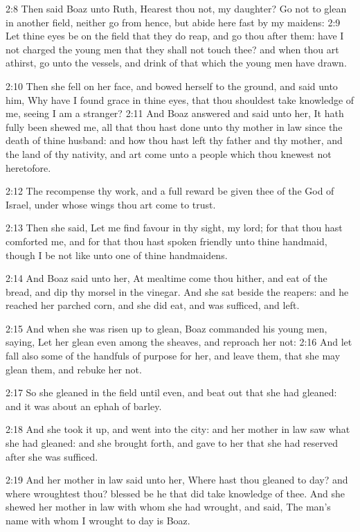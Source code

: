 2:8 Then said Boaz unto Ruth, Hearest thou not, my daughter? Go not to
glean in another field, neither go from hence, but abide here fast by
my maidens: 2:9 Let thine eyes be on the field that they do reap, and
go thou after them: have I not charged the young men that they shall
not touch thee? and when thou art athirst, go unto the vessels, and
drink of that which the young men have drawn.

2:10 Then she fell on her face, and bowed herself to the ground, and
said unto him, Why have I found grace in thine eyes, that thou
shouldest take knowledge of me, seeing I am a stranger?  2:11 And Boaz
answered and said unto her, It hath fully been shewed me, all that
thou hast done unto thy mother in law since the death of thine
husband: and how thou hast left thy father and thy mother, and the
land of thy nativity, and art come unto a people which thou knewest
not heretofore.

2:12 The \LORD recompense thy work, and a full reward be given thee of
the \LORD God of Israel, under whose wings thou art come to trust.

2:13 Then she said, Let me find favour in thy sight, my lord; for that
thou hast comforted me, and for that thou hast spoken friendly unto
thine handmaid, though I be not like unto one of thine handmaidens.

2:14 And Boaz said unto her, At mealtime come thou hither, and eat of
the bread, and dip thy morsel in the vinegar. And she sat beside the
reapers: and he reached her parched corn, and she did eat, and was
sufficed, and left.

2:15 And when she was risen up to glean, Boaz commanded his young men,
saying, Let her glean even among the sheaves, and reproach her not:
2:16 And let fall also some of the handfuls of purpose for her, and
leave them, that she may glean them, and rebuke her not.

2:17 So she gleaned in the field until even, and beat out that she had
gleaned: and it was about an ephah of barley.

2:18 And she took it up, and went into the city: and her mother in law
saw what she had gleaned: and she brought forth, and gave to her that
she had reserved after she was sufficed.

2:19 And her mother in law said unto her, Where hast thou gleaned to
day?  and where wroughtest thou? blessed be he that did take knowledge
of thee. And she shewed her mother in law with whom she had wrought,
and said, The man's name with whom I wrought to day is Boaz.

